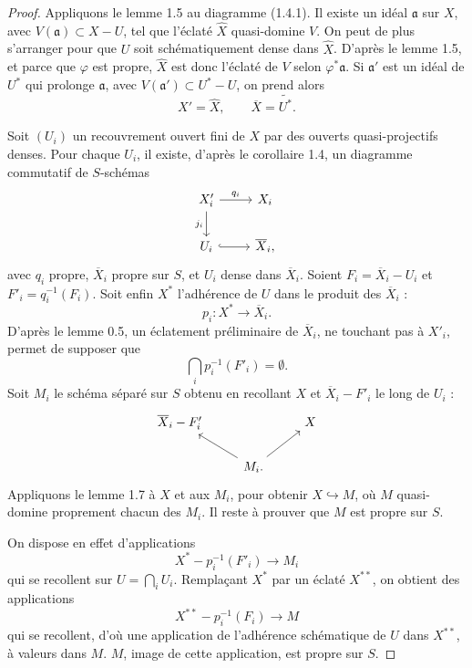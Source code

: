 \documentclass[11pt]{article}
\begin{document}
\begin{proof}
Appliquons le lemme 1.5 au diagramme (1.4.1). Il existe un idéal \(\mathfrak a\) sur \(X\), avec \(V(\mathfrak a)\subset X-U\), tel que l'éclaté \(\widehat X\) quasi-domine \(V\). On peut de plus s'arranger pour que \(U\) soit schématiquement dense dans \(\widehat X\). D'après le lemme 1.5, et parce que \(\varphi\) est propre, \(\widehat X\) est donc l'éclaté de \(V\) selon \(\varphi^*\mathfrak a\). Si \(\mathfrak a'\) est un idéal de \(U^*\) qui prolonge \(\mathfrak a\), avec \(V(\mathfrak a')\subset U^*-U\), on prend alors
\[
 X'=\widehat X,\qquad \overline X=\widetilde{U^*}.
\]

Soit \((U_i)\) un recouvrement ouvert fini de \(X\) par des ouverts quasi-projectifs denses. Pour chaque \(U_i\), il existe, d'après le corollaire 1.4, un diagramme commutatif de \(S\)-schémas
\[
\begin{tikzcd}
X'_i \ar[r,"q_i"] \ar[d,"j_i"'] & X_i \\
U_i \ar[r,hook] & \overline X_i,
\end{tikzcd}
\]
avec \(q_i\) propre, \(\overline X_i\) propre sur \(S\), et \(U_i\) dense dans \(\overline X_i\). Soient \(F_i=\overline X_i-U_i\) et \(F'_i=q_i^{-1}(F_i)\). Soit enfin \(X^*\) l'adhérence de \(U\) dans le produit des \(\overline X_i\) :
\[
p_i:X^*\longrightarrow \overline X_i.
\]
D'après le lemme 0.5, un éclatement préliminaire de \(\overline X_i\), ne touchant pas à \(X'_i\), permet de supposer que
\[
\bigcap_i p_i^{-1}(F'_i)=\emptyset.
\]
Soit \(M_i\) le schéma séparé sur \(S\) obtenu en recollant \(X\) et \(\overline X_i-F'_i\) le long de \(U_i\) :
\[
\begin{tikzcd}
\overline X_i-F'_i && X \\
& M_i. \ar[ul] \ar[ur]
\end{tikzcd}
\]
Appliquons le lemme 1.7 à \(X\) et aux \(M_i\), pour obtenir \(X\hookrightarrow M\), où \(M\) quasi-domine proprement chacun des \(M_i\). Il reste à prouver que \(M\) est propre sur \(S\).

On dispose en effet d'applications
\[
X^*-p_i^{-1}(F'_i)\longrightarrow M_i
\]
qui se recollent sur \(U=\bigcap_i U_i\). Remplaçant \(X^*\) par un éclaté \(X^{**}\), on obtient des applications
\[
X^{**}-p_i^{-1}(F_i)\longrightarrow M
\]
qui se recollent, d'où une application de l'adhérence schématique de \(U\) dans \(X^{**}\), à valeurs dans \(M\). \(M\), image de cette application, est propre sur \(S\).
\end{proof}
\end{document}
